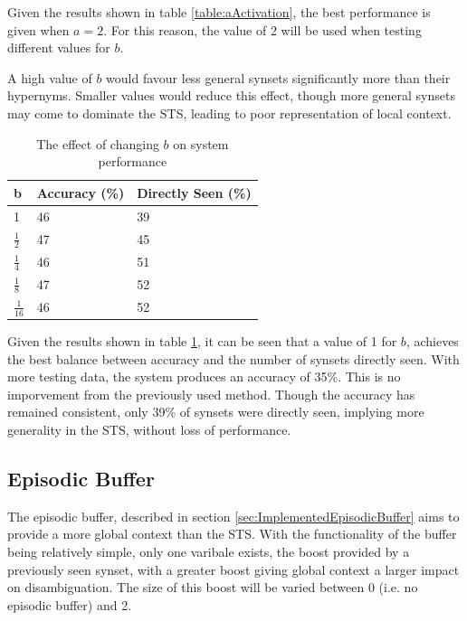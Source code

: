 \documentclass[]{article}
\begin{document}
Given the results shown in table \ref{table:aActivation}, the best performance is given when $a = 2$. For this reason, the value of 2 will be used when testing different values for $b$.

A high value of $b$ would favour less general synsets significantly more than their hypernyms. Smaller values would reduce this effect, though more general synsets may come to dominate the STS, leading to poor representation of local context.

\begin{table}
\begin{center}
\begin{tabular}{|p{2em}|p{7em}|p{7em}|}
	\hline
	b & Accuracy (\%) & Directly Seen (\%) \\
	\hline
	1 & 46 & 39\\
	\hline
	$\frac{1}{2}$ & 47 & 45\\
	\hline
	$\frac{1}{4}$ & 46 & 51\\
	\hline
	$\frac{1}{8}$ & 47 & 52\\
	\hline
	$\frac{1}{16}$ & 46 & 52\\
	\hline
\end{tabular}
\end{center}
\caption{The effect of changing $b$ on system performance}
\label{table:bActivation}
\end{table}

Given the results shown in table \ref{table:bActivation}, it can be seen that a value of 1 for $b$, achieves the best balance between accuracy and the number of synsets directly seen. With more testing data, the system produces an accuracy of 35\%. This is no imporvement from the previously used method. Though the accuracy has remained consistent, only 39\% of synsets were directly seen, implying more generality in the STS, without loss of performance.

\subsection{Episodic Buffer}
\label{sec:EvEpisodicBuffer}
The episodic buffer, described in section \ref{sec:ImplementedEpisodicBuffer} aims to provide a more global context than the STS. With the functionality of the buffer being relatively simple, only one varibale exists, the boost provided by a previously seen synset, with a greater boost giving global context a larger impact on disambiguation. The size of this boost will be varied between 0 (i.e. no episodic buffer) and 2.
\end{document}
